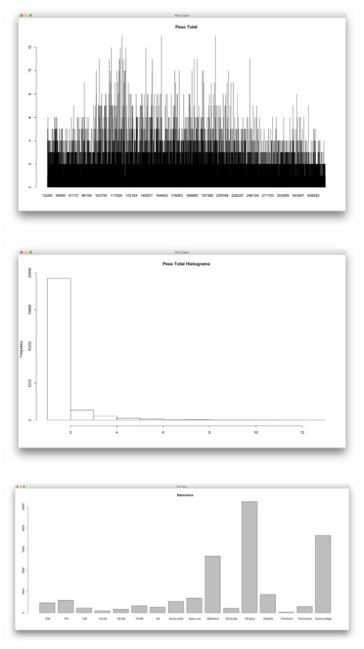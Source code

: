 \documentclass{article}
\begin{document}
 \begin{center}
   \hbox{\hspace{-5.8em}\includegraphics[scale=0.4]{graficas/pesoTotal}}
 \end{center}
 \begin{center}
   \hbox{\hspace{-5.8em}\includegraphics[scale=0.4]{graficas/pesoTotalHist}}
 \end{center}
 \begin{center}
   \hbox{\hspace{-6.1em}\includegraphics[scale=0.3]{graficas/educacion}}
 \end{center}
\end{document}

